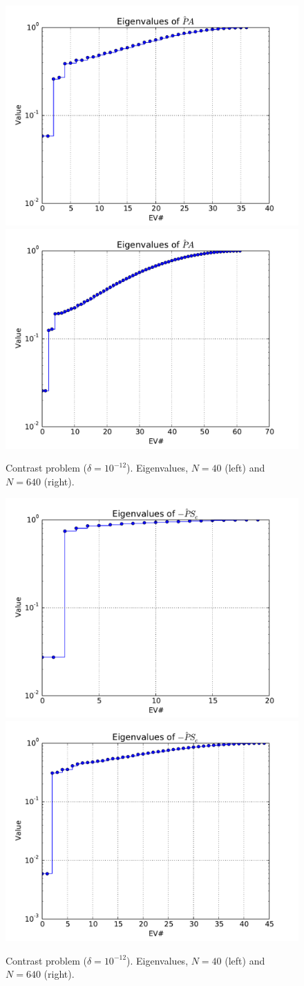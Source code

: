 \documentclass{article}
\begin{document}
\begin{figure}
\begin{center}
\includegraphics[width=0.49\linewidth]{../EV[A],problem=12,exact=0,N=40,cycles=2.pdf}
\includegraphics[width=0.49\linewidth]{../EV[A],problem=12,exact=0,N=640,cycles=2.pdf}
\caption{Contrast problem ($\delta=10^{-12}$). Eigenvalues, $N=40$ (left) and $N=640$ (right).}
\label{contrast12-evA}
\end{center}
\end{figure}

\begin{figure}
\begin{center}
\includegraphics[width=0.49\linewidth]{../EV[-S_c],problem=12,exact=0,N=40,cycles=2.pdf}
\includegraphics[width=0.49\linewidth]{../EV[-S_c],problem=12,exact=0,N=640,cycles=2.pdf}
\caption{Contrast problem ($\delta=10^{-12}$). Eigenvalues, $N=40$ (left) and $N=640$ (right).}
\end{center}
\label{contrast12-evS}
\end{figure}
\end{document}

